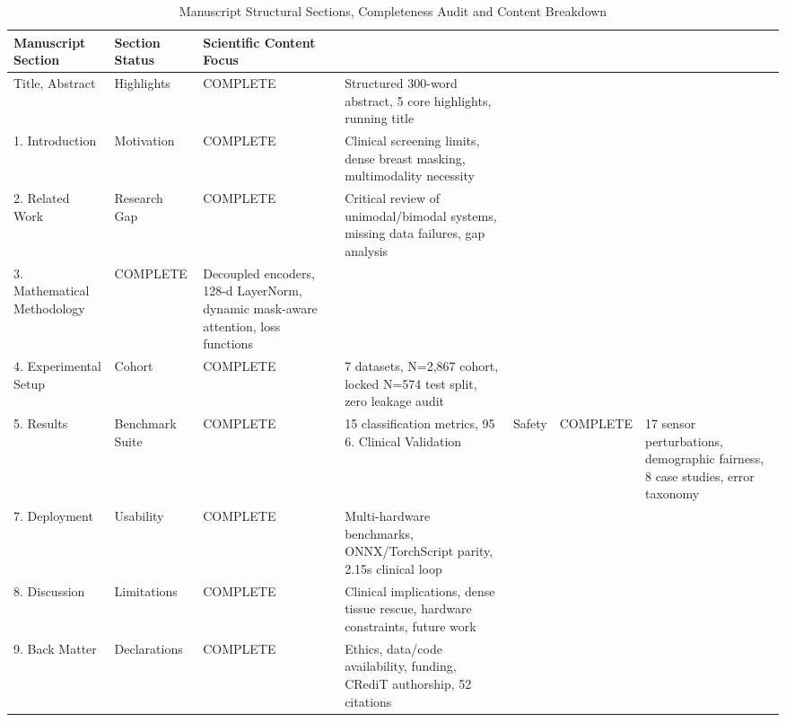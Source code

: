 \begin{table}
\caption{Manuscript Structural Sections, Completeness Audit and Content Breakdown}
\label{tab:table_6_01_02_manuscript_structural_sections_and_completeness_audit}
\begin{tabular}{lll}
\toprule
Manuscript Section & Section Status & Scientific Content Focus \\
\midrule
Title, Abstract & Highlights & COMPLETE & Structured 300-word abstract, 5 core highlights, running title \\
1. Introduction & Motivation & COMPLETE & Clinical screening limits, dense breast masking, multimodality necessity \\
2. Related Work & Research Gap & COMPLETE & Critical review of unimodal/bimodal systems, missing data failures, gap analysis \\
3. Mathematical Methodology & COMPLETE & Decoupled encoders, 128-d LayerNorm, dynamic mask-aware attention, loss functions \\
4. Experimental Setup & Cohort & COMPLETE & 7 datasets, N=2,867 cohort, locked N=574 test split, zero leakage audit \\
5. Results & Benchmark Suite & COMPLETE & 15 classification metrics, 95%
6. Clinical Validation & Safety & COMPLETE & 17 sensor perturbations, demographic fairness, 8 case studies, error taxonomy \\
7. Deployment & Usability & COMPLETE & Multi-hardware benchmarks, ONNX/TorchScript parity, 2.15s clinical loop \\
8. Discussion & Limitations & COMPLETE & Clinical implications, dense tissue rescue, hardware constraints, future work \\
9. Back Matter & Declarations & COMPLETE & Ethics, data/code availability, funding, CRediT authorship, 52 citations \\
\bottomrule
\end{tabular}
\end{table}
